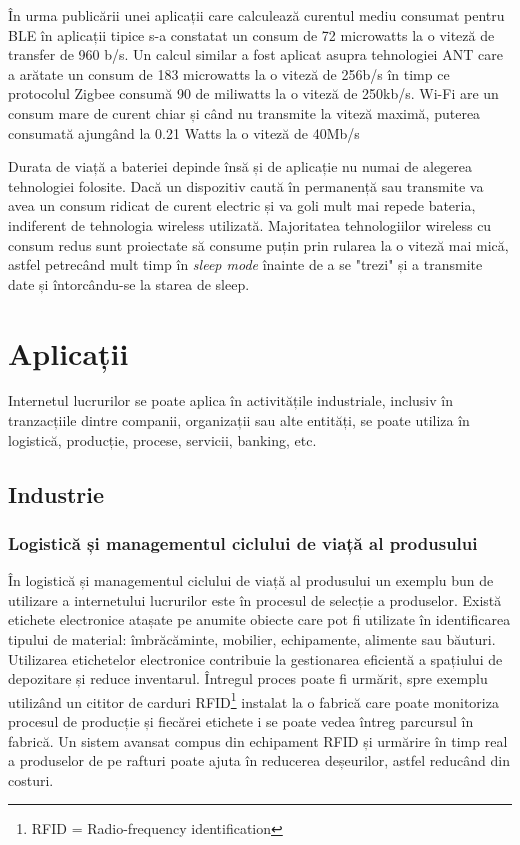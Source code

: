 \documentclass[12pt,a4paper]{report}
\begin{document}
În urma publicării unei aplicații\cite{lowen} care calculează curentul mediu consumat pentru BLE în aplicații tipice s-a constatat un consum de 72 microwatts la o viteză de transfer de 960 b/s. Un calcul similar a fost aplicat asupra tehnologiei ANT care a arătate un consum de 183 microwatts la o viteză de 256b/s în timp ce protocolul Zigbee consumă 90 de miliwatts la o viteză de 250kb/s.
Wi-Fi are un consum mare de curent chiar și când nu transmite la viteză maximă, puterea consumată ajungând la 0.21 Watts la o viteză de 40Mb/s

Durata de viață a bateriei depinde însă și de aplicație nu numai de alegerea tehnologiei folosite. Dacă un dispozitiv caută în permanență sau transmite va avea un consum ridicat de curent electric și va goli mult mai repede bateria, indiferent de tehnologia wireless utilizată. Majoritatea tehnologiilor wireless cu consum redus sunt proiectate să consume puțin prin rularea la o viteză mai mică, astfel petrecând mult timp în \textit{sleep mode} înainte de a se "trezi" și a transmite date și întorcându-se la starea de sleep.

\section{Aplicații}
Internetul lucrurilor se poate aplica în activitățile industriale, inclusiv în tranzacțiile dintre companii, organizații sau alte entități, se poate utiliza în logistică, producție, procese, servicii, banking, etc\cite{iotfields}.
\subsection{Industrie}

\subsubsection{Logistică și managementul ciclului de viață al produsului}
În logistică și managementul ciclului de viață al produsului un exemplu bun de utilizare a internetului lucrurilor este în procesul de selecție a produselor. Există etichete electronice atașate pe anumite obiecte care pot fi utilizate în identificarea tipului de material: îmbrăcăminte, mobilier, echipamente, alimente sau băuturi. Utilizarea etichetelor electronice contribuie la gestionarea eficientă a spațiului de depozitare și reduce inventarul. Întregul proces poate fi urmărit, spre exemplu utilizând un cititor de carduri RFID\footnote{RFID = Radio-frequency identification} instalat la o fabrică care poate monitoriza procesul de producție și fiecărei etichete i se poate vedea întreg parcursul în fabrică. Un sistem avansat compus din echipament RFID și urmărire în timp real a produselor de pe rafturi poate ajuta în reducerea deșeurilor, astfel reducând din costuri.
\end{document}

